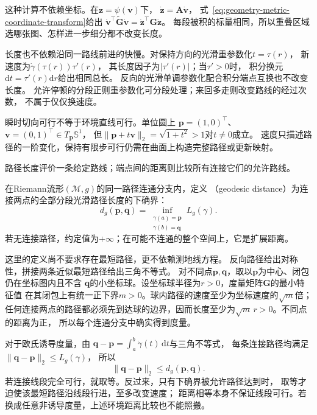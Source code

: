 这种计算不依赖坐标。在$\bm z=\psi(\bm v)$下，
$\dot{\bm z}=\bm A\dot{\bm v}$，
式~\eqref{eq:geometry-metric-coordinate-transform}给出
$\dot{\bm v}^\top\widetilde{\bm G}\dot{\bm v}
=\dot{\bm z}^\top\bm G\dot{\bm z}$。
每段被积的标量相同，所以重叠区域选哪张图、怎样进一步细分都不改变长度。

长度也不依赖沿同一路线前进的快慢。对保持方向的光滑重参数化$t=\tau(r)$，
新速度为$\dot\gamma(\tau(r))\tau'(r)$，
其长度因子为$|\tau'(r)|$；当$\tau'>0$时，
积分换元$\mathrm dt=\tau'(r)\mathrm dr$给出相同总长。
反向的光滑单调参数化配合积分端点互换也不改变长度。
允许停顿的分段正则重参数化可分段处理；来回多走则改变路线的经过次数，
不属于仅仅换速度。

瞬时切向可行不等于环境直线可行。单位圆上
$\bm p=(1,0)^\top$、$\bm v=(0,1)^\top\in T_{\bm p}\mathbb S^1$，
但$\lVert\bm p+t\bm v\rVert_2=\sqrt{1+t^2}>1$对$t\neq0$成立。
速度只描述路径的一阶变化，保持有限步可行仍需在曲面上构造完整路径或更新映射。


路径长度评价一条给定路线；端点间的距离则比较所有连接它们的允许路线。

\begin{definition}[测地距离]
\label{def:geometry-geodesic-distance}
在Riemann流形$(\mathcal M,g)$的同一路径连通分支内，定义
（geodesic distance）为连接两点的全部分段光滑路径长度的下确界：
\begin{equation}
 d_g(\bm p,\bm q)=
 \inf_{\substack{\gamma(a)=\bm p\\\gamma(b)=\bm q}}L_g(\gamma).
 \label{eq:geometry-geodesic-distance}
\end{equation}
若无连接路径，约定值为$+\infty$；在可能不连通的整个空间上，它是扩展距离。
\end{definition}
这里的定义尚不要求存在最短路径，更不依赖测地线方程。
反向路径给出对称性，拼接两条近似最短路径给出三角不等式。
对不同点$\bm p,\bm q$，取以$\bm p$为中心、闭包仍在坐标图内且不含
$\bm q$的小坐标球。设坐标球半径为$r>0$，度量矩阵$\bm G$的最小特征值
在其闭包上有统一正下界$m>0$。球内路径的速度至少为坐标速度的$\sqrt m$倍；
任何连接两点的路径都必须先到达球的边界，因而长度至少为$\sqrt m\,r>0$。不同点的距离为正，
所以每个连通分支中确实得到度量。

对于欧氏诱导度量，由
$\bm q-\bm p=\int_a^b\dot\gamma(t)\,\mathrm dt$与三角不等式，
每条连接路径均满足$\lVert\bm q-\bm p\rVert_2\leq L_g(\gamma)$，
所以
\[
 \lVert\bm q-\bm p\rVert_2\leq d_g(\bm p,\bm q).
\]
若连接线段完全可行，就取等。反过来，只有下确界被允许路径达到时，
取等才迫使该最短路径沿线段行进，至多改变速度；
距离相等本身不保证线段可行。若换成任意非诱导度量，上述环境距离比较也不能照搬。

